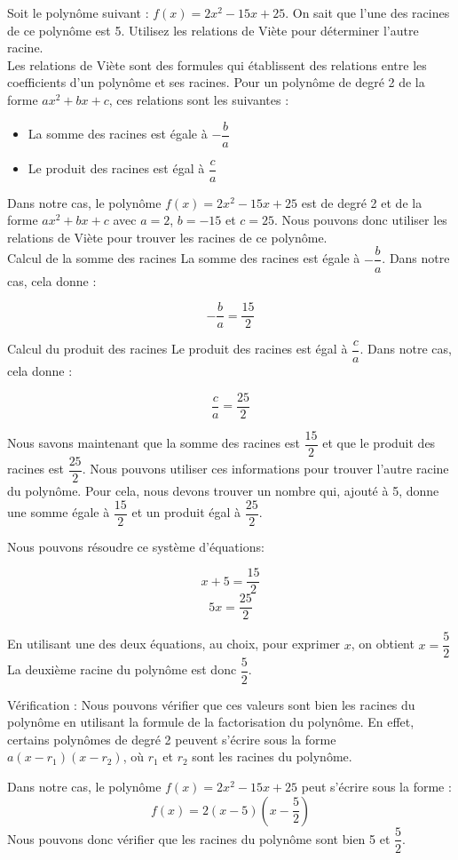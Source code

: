 \documentclass[french]{book}
\begin{document}
\newpage
\begin{exemple}
Soit le polynôme suivant : $f(x) = 2x^2 - 15x + 25$. On sait que l'une des racines de ce polynôme est 5. Utilisez les relations de Viète pour déterminer l'autre racine. \\

Les relations de Viète sont des formules qui établissent des relations entre les coefficients d'un polynôme et ses racines. Pour un polynôme de degré 2 de la forme $ax^2 + bx + c$, ces relations sont les suivantes :\\

\begin{itemize}
\item La somme des racines est égale à $-\dfrac{b}{a}$
\item Le produit des racines est égal à $\dfrac{c}{a}$
\end{itemize}

Dans notre cas, le polynôme $f(x) = 2x^2 - 15x + 25$ est de degré 2 et de la forme $ax^2 + bx + c$ avec $a=2$, $b=-15$ et $c=25$. Nous pouvons donc utiliser les relations de Viète pour trouver les racines de ce polynôme.\\

Calcul de la somme des racines
La somme des racines est égale à $-\dfrac{b}{a}$. Dans notre cas, cela donne :

$$-\dfrac{b}{a} = \dfrac{15}{2}$$

Calcul du produit des racines
Le produit des racines est égal à $\dfrac{c}{a}$. Dans notre cas, cela donne :

$$\dfrac{c}{a} = \dfrac{25}{2}$$

Nous savons maintenant que la somme des racines est $\dfrac{15}{2}$ et que le produit des racines est $\dfrac{25}{2}$. Nous pouvons utiliser ces informations pour trouver l'autre racine du polynôme. Pour cela, nous devons trouver un nombre qui, ajouté à 5, donne une somme égale à $\dfrac{15}{2}$ et un produit égal à $\dfrac{25}{2}$.

Nous pouvons résoudre ce système d'équations:

$$x + 5 = \frac{15}{2}$$
$$5x = \frac{25}{2}$$

En utilisant une des deux équations, au choix, pour exprimer $x$, on obtient $x = \dfrac{5}{2}$
La deuxième racine du polynôme est donc $ \dfrac{5}{2}$.

Vérification :
Nous pouvons vérifier que ces valeurs sont bien les racines du polynôme en utilisant la formule de la factorisation du polynôme. En effet, certains polynômes de degré 2 peuvent s'écrire sous la forme $a(x-r_1)(x-r_2)$, où $r_1$ et $r_2$ sont les racines du polynôme.

Dans notre cas, le polynôme $f(x) = 2x^2 - 15x + 25$ peut s'écrire sous la forme :
$$f(x) = 2(x - 5)(x - \dfrac{5}{2})$$
Nous pouvons donc vérifier que les racines du polynôme sont bien 5 et $\dfrac{5}{2}$.
\end{exemple}
\end{document}
